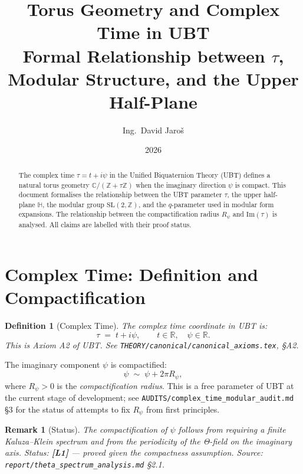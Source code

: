 \documentclass[11pt,a4paper]{article}
\title{Torus Geometry and Complex Time in UBT\\
\large Formal Relationship between $\tau$, Modular Structure, and the Upper Half-Plane}
\author{Ing.\ David Jaroš}
\date{2026}
\newtheorem{definition}{Definition}
\newtheorem{remark}{Remark}
\begin{document}
\maketitle

\begin{abstract}
The complex time $\tau = t + i\psi$ in the Unified Biquaternion Theory (UBT)
defines a natural torus geometry $\mathbb{C}/(\mathbb{Z} + \tau\mathbb{Z})$
when the imaginary direction $\psi$ is compact. This document formalises the
relationship between the UBT parameter $\tau$, the upper half-plane $\mathbb{H}$,
the modular group $\mathrm{SL}(2,\mathbb{Z})$, and the $q$-parameter used in
modular form expansions. The relationship between the compactification radius
$R_\psi$ and $\mathrm{Im}(\tau)$ is analysed. All claims are labelled with
their proof status.
\end{abstract}

\section{Complex Time: Definition and Compactification}
\label{sec:tau_def}

\begin{definition}[Complex Time]\label{def:complex_time}
The complex time coordinate in UBT is:
\begin{equation}
  \tau \;=\; t + i\psi, \qquad t \in \mathbb{R},\quad \psi \in \mathbb{R}.
\end{equation}
This is Axiom A2 of UBT. See \texttt{THEORY/canonical/canonical\_axioms.tex}, §A2.
\end{definition}

The imaginary component $\psi$ is compactified:
\begin{equation}
  \psi \;\sim\; \psi + 2\pi R_\psi,
\end{equation}
where $R_\psi > 0$ is the \emph{compactification radius}. This is a free
parameter of UBT at the current stage of development; see
\texttt{AUDITS/complex\_time\_modular\_audit.md} §3 for the status of
attempts to fix $R_\psi$ from first principles.

\begin{remark}[Status]
The compactification of $\psi$ follows from requiring a finite Kaluza--Klein
spectrum and from the periodicity of the Θ-field on the imaginary axis.
Status: \textbf{[L1]} — proved given the compactness assumption.
Source: \texttt{report/theta\_spectrum\_analysis.md} §2.1.
\end{remark}
\end{document}
